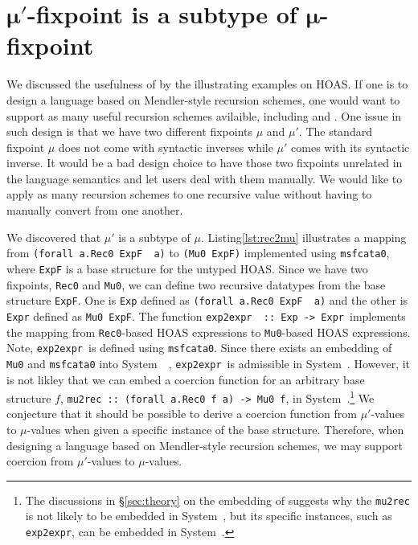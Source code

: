 \section{$\pmb{\mu'}$-fixpoint is a subtype of $\pmb{\mu}$-fixpoint}\label{sec:murec}
We discussed the usefulness of \msfit{} by the illustrating examples on HOAS.
If one is to design a language based on Mendler-style recursion schemes,
one would want to support as many useful recursion schemes avilaible,
including \MIt{} and \msfit{}. One issue in such design is that we have
two different fixpoints $\mu$ and $\mu'$. The standard fixpoint $\mu$
does not come with syntactic inverses while $\mu'$ comes with
its syntactic inverse. It would be a bad design choice to have those
two fixpoints unrelated in the language semantics and let users deal
with them manually. We would like to apply as many recursion schemes to
one recursive value without having to manually convert from one another.

We discovered that $\mu'$ is a subtype of $\mu$. Listing\;\ref{lst:rec2mu}
illustrates a mapping from \lstinline{(forall a.Rec0 ExpF  a)}
to \lstinline{(Mu0 ExpF)} implemented using \lstinline{msfcata0},
where \lstinline{ExpF} is a base structure for the untyped HOAS.
Since we have two fixpoints, \lstinline{Rec0} and \lstinline{Mu0},
we can define two recursive datatypes from the base structure \lstinline{ExpF}.
One is \lstinline{Exp} defined as \lstinline{(forall a.Rec0 ExpF  a)} and
the other is \lstinline{Expr} defined as \lstinline{Mu0 ExpF}.
The function \lstinline{exp2expr  :: Exp -> Expr}\, implements the mapping from
\lstinline{Rec0}-based HOAS expressions to \lstinline{Mu0}-based
HOAS expressions. Note, \lstinline{exp2expr}\, is defined
using \lstinline{msfcata0}.  Since there exists an embedding of
\lstinline{Mu0} and \lstinline{msfcata0} into System~\Fw\ \cite{AhnShe11},
\lstinline{exp2expr}\, is admissible in System~\Fw. However, it is not likley
that we can embed a coercion function for an arbitrary base structure $f$,
\lstinline{mu2rec :: (forall a.Rec0 f a) -> Mu0 f}, in System~\Fw.\footnote{
	The discussions in \S\ref{sec:theory} on the embedding of \msfit{}
	suggests why the \lstinline{mu2rec} is not likely to be embedded
	in System~\Fw, but its specific instances, such as
	\lstinline{exp2expr}, can be embedded in System~\Fw.}
We conjecture that it should be possible to derive a coercion function
from $\mu'$-values to $\mu$-values when given a specific instance of
the base structure. Therefore, when designing a language based on Mendler-style
recursion schemes, we may support coercion from $\mu'$-values to $\mu$-values.

